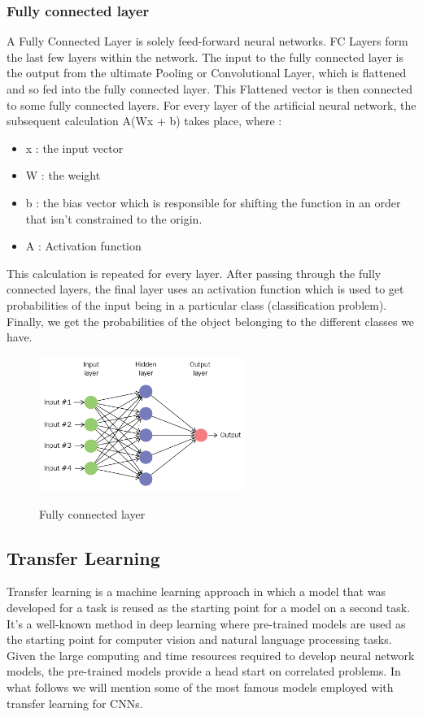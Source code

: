\documentclass[12pt,a4paper,oneside,english]{book}
\begin{document}
\subsubsection{Fully connected layer}
A Fully Connected Layer is solely feed-forward neural networks. FC Layers form the last few layers within the network. The input to the fully connected layer is the output from the ultimate Pooling or Convolutional Layer, which is flattened and so fed into the fully connected layer. This Flattened vector is then connected to some fully connected layers. For every layer of the artificial neural network, the subsequent calculation A(Wx + b) takes place,  where :
\begin{itemize}
    \item x : the input vector 
    \item W : the weight 
    \item b : the bias vector which is responsible for shifting the function in an order that isn't constrained to the origin.
    \item A : Activation function

\end{itemize}
This calculation is repeated for every layer. After passing through the fully connected layers, the final layer uses an activation function which is used to get probabilities of the input being in a particular class (classification problem). Finally, we get the probabilities of the object belonging to the different classes we have.

\begin{figure}[H]
    \centering
    \includegraphics[width=0.6\textwidth]{figures/fullyConnectedLayers.png}
    \caption{Fully connected layer}
    \label{fig:fullyConnected}
    \cite{fullyConnected}
\end{figure}

\subsection{Transfer Learning}
Transfer learning is a machine learning approach in which a model that was developed for a task is reused as the starting point for a model on a second task.
It's a well-known method in deep learning where pre-trained models are used as the starting point for computer vision and natural language processing tasks. Given the large computing and time resources required to develop neural network models, the pre-trained models provide a head start on correlated problems.
In what follows we will mention some of the most famous models employed with transfer learning for CNNs.
\end{document}
